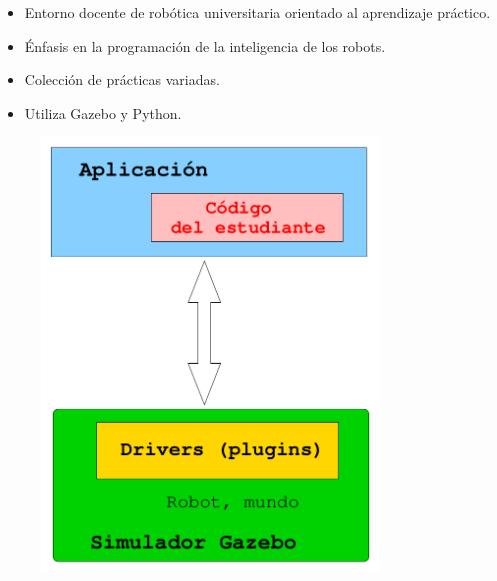 \documentclass[notes,slidesec,a4]{seminar}
\begin{document}
\begin{hslide}
	\begin{minipage}{0.6\textwidth}
		\begin{itemize}
			\item Entorno docente de robótica universitaria orientado al aprendizaje práctico.
			\item Énfasis en la programación de la inteligencia de los robots. 
			\item Colección de prácticas variadas.
			\item Utiliza Gazebo y Python.
		\end{itemize}
	\end{minipage}
	\begin{minipage}{0.4\textwidth}
		\begin{center}
			\begin{figure}
				\includegraphics[width=0.8\textwidth]{esquemapracticas02.png}
			\end{figure}
		\end{center}
	\end{minipage}
\end{hslide}
\end{document}
